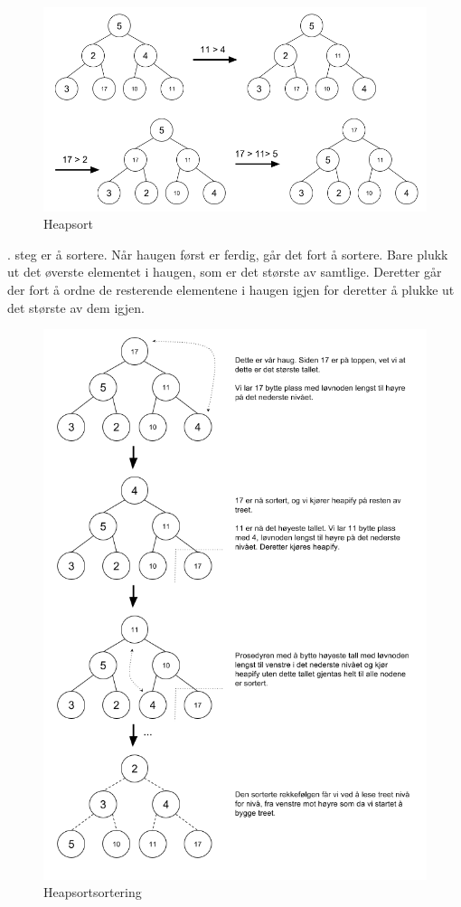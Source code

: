 \begin{figure}[H]
\includegraphics[scale=0.6]{images/heapsort}
\centering %
\caption{Heapsort}
\label{fig:heapsort}
\end{figure}

. steg er å sortere. Når haugen først er ferdig, går det fort å sortere. Bare plukk ut det øverste elementet i haugen, som er det største av samtlige. Deretter går der fort å ordne de resterende elementene i haugen igjen for deretter å plukke ut det største av dem igjen.

\begin{figure}[H]
\includegraphics[scale=0.6]{images/heapsort2}
\centering %
\caption{Heapsortsortering}
\label{fig:heapsort2}
\end{figure}

